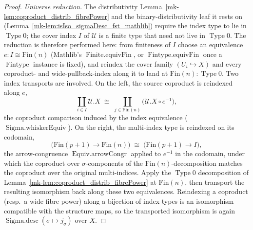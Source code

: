 \begin{proof}
  \emph{Universe reduction.} The distributivity Lemma~\ref{mk-lem:coproduct_distrib_fibrePower} and the
  binary-distributivity leaf it rests on (Lemma~\ref{mk-lem:isIso_sigmaDesc_fst_mathlib}) require the
  index type to lie in \(\operatorname{Type} 0\); the cover index \(I\) of \(\mathcal{U}\) is a
  finite type that need not live in \(\operatorname{Type} 0\). The reduction is therefore performed
  here: from finiteness of \(I\) choose an equivalence \(e : I \cong \mathrm{Fin}(n)\) (Mathlib's
  \(\operatorname{Finite.equivFin}\), or \(\operatorname{Fintype.equivFin}\) once a \(\operatorname{Fintype}\)
  instance is fixed), and reindex the cover family \((U_i \hookrightarrow X)\) and every coproduct- and
  wide-pullback-index along it to land at \(\mathrm{Fin}(n) : \operatorname{Type} 0\). Two index
  transports are involved. On the left, the source coproduct is reindexed along \(e\),
  \[
    \coprod_{i \in I} \mathcal{U}.X
      \;\cong\;
    \coprod_{j \in \mathrm{Fin}(n)} \bigl(\mathcal{U}.X \circ e^{-1}\bigr),
  \]
  the coproduct comparison induced by the index equivalence (\(\operatorname{Sigma.whiskerEquiv}\)).
  On the right, the multi-index type is reindexed on its codomain,
  \[
    \bigl(\mathrm{Fin}(p+1) \to \mathrm{Fin}(n)\bigr)
      \;\cong\;
    \bigl(\mathrm{Fin}(p+1) \to I\bigr),
  \]
  the arrow-congruence \(\operatorname{Equiv.arrowCongr}\) applied to \(e^{-1}\) in the codomain, under
  which the coproduct over \(\sigma\)-components of the \(\mathrm{Fin}(n)\)-decomposition matches the
  coproduct over the original multi-indices. Apply the \(\operatorname{Type} 0\) decomposition of
  Lemma~\ref{mk-lem:coproduct_distrib_fibrePower} at \(\mathrm{Fin}(n)\), then transport the resulting
  isomorphism back along these two equivalences. Reindexing a coproduct (resp.\ a wide fibre power)
  along a bijection of index types is an isomorphism compatible with the structure maps, so the
  transported isomorphism is again \(\operatorname{Sigma.desc}(\sigma \mapsto j_\sigma)\) over \(X\).
\end{proof}

